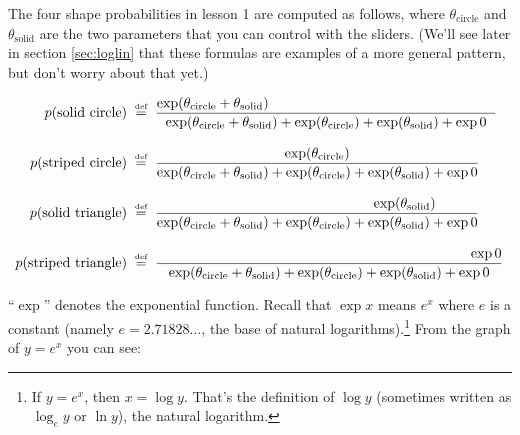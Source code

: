 \documentclass[11pt]{article}
\newcommand{\defeq}{\;\stackrel{\mbox{\tiny def}}{=}\;}
\begin{document}
The four shape probabilities in lesson 1 are computed as follows,
where $\theta_{\textrm{circle}}$ and $\theta_{\textrm{solid}}$ are the
two parameters that you can control with the sliders.  (We'll see later
in section \ref{sec:loglin} that these formulas are examples of a more
general pattern, but don't worry about that yet.)


\begin{align}
p(\text{solid circle}) & \defeq \frac{\exp (\theta_{\textrm{circle}}+\theta_{\textrm{solid}})\hspace{57mm}}{\exp (\theta_{\textrm{circle}} + \theta_{\textrm{solid}}) + \exp (\theta_{\textrm{circle}}) + \exp (\theta_{\textrm{solid}}) + \exp 0} \label{eqn:solidcircle}\\
\rule{0in}{1.5\baselineskip}
p(\text{striped circle}) & \defeq \frac{\exp (\theta_{\textrm{circle}})\hspace{0mm}}{\exp (\theta_{\textrm{circle}} + \theta_{\textrm{solid}}) + \exp (\theta_{\textrm{circle}}) + \exp (\theta_{\textrm{solid}}) + \exp 0} \label{eqn:stripedcircle}\\
\rule{0in}{1.5\baselineskip}
p(\text{solid triangle}) & \defeq \frac{\hspace{44mm}\exp (\theta_{\textrm{solid}})}{\exp (\theta_{\textrm{circle}} + \theta_{\textrm{solid}}) + \exp (\theta_{\textrm{circle}}) + \exp (\theta_{\textrm{solid}}) + \exp 0} \label{eqn:solidtriangle}\\
\rule{0in}{1.5\baselineskip}
p(\text{striped triangle}) & \defeq \frac{\hspace{79mm}\exp 0}{\exp (\theta_{\textrm{circle}} + \theta_{\textrm{solid}}) + \exp (\theta_{\textrm{circle}}) + \exp (\theta_{\textrm{solid}}) + \exp 0} \label{eqn:stripedtriangle}
\end{align}

``$\exp$'' denotes the exponential function.  Recall that $\exp x$ means
$e^x$ where $e$ is a constant (namely $e=2.71828\ldots$, the base of
natural logarithms).\footnote{If $y=e^x$, then $x=\log y$.  That's the
  definition of $\log y$ (sometimes written as $\log_e y$ or $\ln y$),
  the natural logarithm.}  From the graph of $y=e^x$ you can see:
\end{document}
